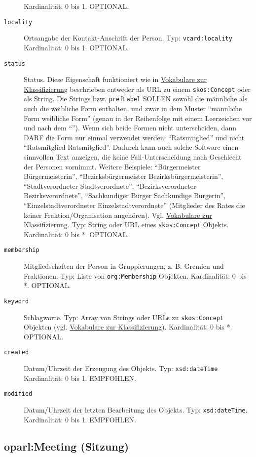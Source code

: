 \documentclass[,a4paper]{article}
\begin{document}
\begin{description}
Kardinalität: 0 bis 1. OPTIONAL.
\item[\texttt{locality}]
Ortsangabe der Kontakt-Anschrift der Person. Typ:
\texttt{vcard:locality} Kardinalität: 0 bis 1. OPTIONAL.
\item[\texttt{status}]
Status. Diese Eigenschaft funktioniert wie in
\hyperref[vokabulareux5fklassifizierung]{Vokabulare zur Klassifizierung}
beschrieben entweder als URL zu einem \texttt{skos:Concept} oder als
String. Die Strings bzw. \texttt{prefLabel} SOLLEN sowohl die männliche
als auch die weibliche Form enthalten, und zwar in dem Muster
``männliche Form \textbar{} weibliche Form'' (genau in der Reihenfolge
mit einem Leerzeichen vor und nach dem ``\textbar{}''). Wenn sich beide
Formen nicht unterscheiden, dann DARF die Form nur einmal verwendet
werden: ``Ratsmitglied'' und nicht ``Ratsmitglied \textbar{}
Ratsmitglied''. Dadurch kann auch solche Software einen sinnvollen Text
anzeigen, die keine Fall-Unterscheidung nach Geschlecht der Personen
vornimmt. Weitere Beispiele: ``Bürgermeister \textbar{}
Bürgermeisterin'', ``Bezirksbürgermeister \textbar{}
Bezirksbürgermeisterin'', ``Stadtverordneter \textbar{}
Stadtverordnete'', ``Bezirksverordneter \textbar{} Bezirksverordnete'',
``Sachkundiger Bürger \textbar{} Sachkundige Bürgerin'',
``Einzelstadtverordneter \textbar{} Einzelstadtverordnete'' (Mitglieder
des Rates die keiner Fraktion/Organisation angehören). Vgl.
\hyperref[vokabulareux5fklassifizierung]{Vokabulare zur
Klassifizierung}. Typ: String oder URL eines \texttt{skos:Concept}
Objekts. Kardinalität: 0 bis *. OPTIONAL.
\item[\texttt{membership}]
Mitgliedschaften der Person in Gruppierungen, z. B. Gremien und
Fraktionen. Typ: Liste von \texttt{org:Membership} Objekten.
Kardinalität: 0 bis *. OPTIONAL.
\item[\texttt{keyword}]
Schlagworte. Typ: Array von Strings oder URLs zu \texttt{skos:Concept}
Objekten (vgl. \hyperref[vokabulareux5fklassifizierung]{Vokabulare zur
Klassifizierung}). Kardinalität: 0 bis *. OPTIONAL.
\item[\texttt{created}]
Datum/Uhrzeit der Erzeugung des Objekts. Typ: \texttt{xsd:dateTime}
Kardinalität: 0 bis 1. EMPFOHLEN.
\item[\texttt{modified}]
Datum/Uhrzeit der letzten Bearbeitung des Objekts. Typ:
\texttt{xsd:dateTime}. Kardinalität: 0 bis 1. EMPFOHLEN.
\end{description}

\subsection{oparl:Meeting (Sitzung)}\label{oparlux5fmeeting}
\end{document}
